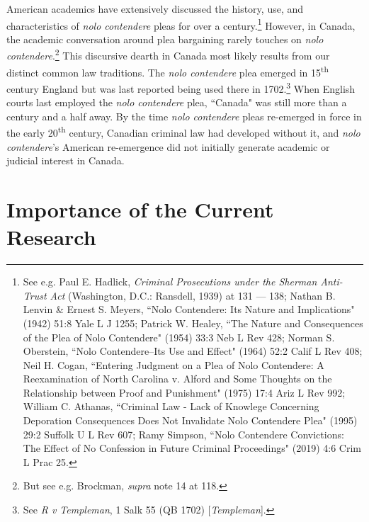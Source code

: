 American academics have extensively discussed the history, use, and characteristics of \textit{nolo contendere} pleas for over a century.\footnote{See e.g. Paul E. Hadlick, \textit{Criminal Prosecutions under the Sherman Anti-Trust Act} (Washington, D.C.: Ransdell, 1939) at 131 — 138; Nathan B. Lenvin \& Ernest S. Meyers, ``Nolo Contendere: Its Nature and Implications" (1942) 51:8 Yale L J 1255; Patrick W. Healey, ``The Nature and Consequences of the Plea of Nolo Contendere" (1954) 33:3 Neb L Rev 428; Norman S. Oberstein, ``Nolo Contendere--Its Use and Effect" (1964) 52:2 Calif L Rev 408; Neil H. Cogan, ``Entering Judgment on a Plea of Nolo Contendere: A Reexamination of North Carolina v. Alford and Some Thoughts on the Relationship between Proof and Punishment" (1975) 17:4 Ariz L Rev 992; William C. Athanas, ``Criminal Law - Lack of Knowlege Concerning Deporation Consequences Does Not Invalidate Nolo Contendere Plea" (1995) 29:2 Suffolk U L Rev 607; Ramy Simpson, ``Nolo Contendere Convictions: The Effect of No Confession in Future Criminal Proceedings" (2019) 4:6 Crim L Prac 25.} However, in Canada, the academic conversation around plea bargaining rarely touches on \textit{nolo contendere}.\footnote{But see e.g. Brockman, \textit{supra} note 14 at 118.} This discursive dearth in Canada most likely results from our distinct common law traditions. The \textit{nolo contendere} plea emerged in 15\textsuperscript{th} century England but was last reported being used there in 1702.\footnote{See \textit{R v Templeman}, 1 Salk 55 (QB 1702) [\textit{Templeman}].} When English courts last employed the \textit{nolo contendere} plea, ``Canada" was still more than a century and a half away. By the time \textit{nolo contendere} pleas re-emerged in force in the early 20\textsuperscript{th} century, Canadian criminal law had developed without it, and \textit{nolo contendere}'s American re-emergence did not initially generate academic or judicial interest in Canada.

\section{Importance of the Current Research}

